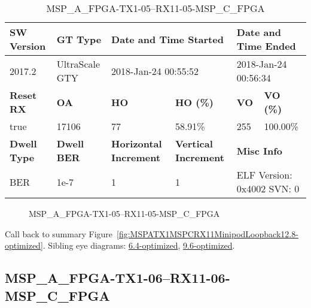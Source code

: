 \begin{table}[h]
\centering
\caption{MSP\_A\_FPGA-TX1-05--RX11-05-MSP\_C\_FPGA}
\label{tab:MSPAFPGATX105RX1105MSPCFPGA12.8-optimized}
\begin{tabular}{@{}|l|l|l|l|l|l|@{}}
\toprule
\textbf{SW Version}                & \textbf{GT Type}   & \multicolumn{2}{l|}{\textbf{Date and Time Started}}            & \multicolumn{2}{l|}{\textbf{Date and Time Ended}}        \\ \midrule
2017.2                       & UltraScale GTY          & \multicolumn{2}{l|}{2018-Jan-24 00:55:52}                   & \multicolumn{2}{l|}{2018-Jan-24 00:56:34}               \\ \midrule
\textbf{Reset RX}                  & \textbf{OA} & \textbf{HO}   & \textbf{HO (\%)} & \textbf{VO} & \textbf{VO (\%)} \\ \midrule
true & 17106        & 77          & 58.91\%        & 255        & 100.00\%       \\ \midrule
\textbf{Dwell Type}                & \textbf{Dwell BER} & \textbf{Horizontal Increment} & \textbf{Vertical Increment}    & \multicolumn{2}{l|}{\textbf{Misc Info}}                  \\ \midrule
BER                            & 1e-7        & 1        & 1           & \multicolumn{2}{l|}{ELF Version: 0x4002 SVN: 0}                         \\ \bottomrule
\end{tabular}
\end{table}

\begin{figure}[h]
\caption{MSP\_A\_FPGA-TX1-05--RX11-05-MSP\_C\_FPGA} \label{fig:MSPAFPGATX105RX1105MSPCFPGA12.8-optimized}
\end{figure}

Call back to summary Figure~\ref{fig:MSPATX1MSPCRX11MinipodLoopback12.8-optimized}.
Sibling eye diagrams: \hyperref[sec:MSPAFPGATX105RX1105MSPCFPGA6.4-optimized]{6.4-optimized}, \hyperref[sec:MSPAFPGATX105RX1105MSPCFPGA9.6-optimized]{9.6-optimized}.

\clearpage
\newpage


\subsection{MSP\_A\_FPGA-TX1-06--RX11-06-MSP\_C\_FPGA}\label{sec:MSPAFPGATX106RX1106MSPCFPGA12.8-optimized}


